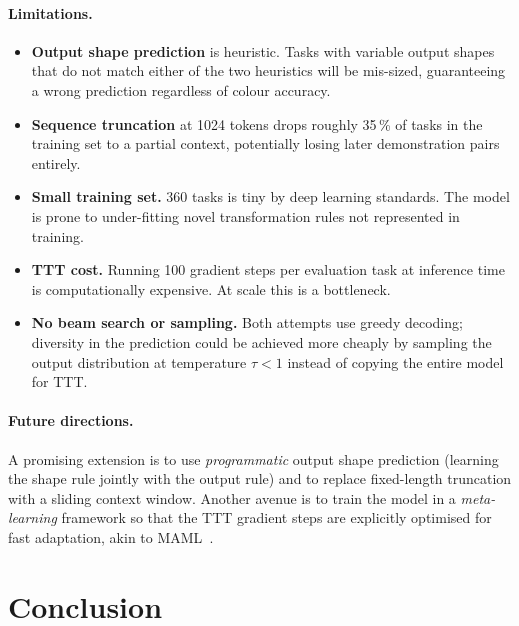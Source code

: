 \documentclass[11pt,a4paper]{article}
\begin{document}
\paragraph{Limitations.}
\begin{itemize}[noitemsep]
  \item \textbf{Output shape prediction} is heuristic.  Tasks with variable output
        shapes that do not match either of the two heuristics will be mis-sized,
        guaranteeing a wrong prediction regardless of colour accuracy.
  \item \textbf{Sequence truncation} at 1024 tokens drops roughly 35\,\% of tasks in
        the training set to a partial context, potentially losing later demonstration
        pairs entirely.
  \item \textbf{Small training set.}  360 tasks is tiny by deep learning standards.
        The model is prone to under-fitting novel transformation rules not represented in
        training.
  \item \textbf{TTT cost.}  Running 100 gradient steps per evaluation task at inference
        time is computationally expensive.  At scale this is a bottleneck.
  \item \textbf{No beam search or sampling.}  Both attempts use greedy decoding;
        diversity in the prediction could be achieved more cheaply by sampling the
        output distribution at temperature $\tau < 1$ instead of copying the entire
        model for TTT.
\end{itemize}

\paragraph{Future directions.}
A promising extension is to use \emph{programmatic} output shape prediction (learning
the shape rule jointly with the output rule) and to replace fixed-length truncation with
a sliding context window.  Another avenue is to train the model in a
\emph{meta-learning} framework so that the TTT gradient steps are explicitly optimised
for fast adaptation, akin to MAML~\cite{finn2017model}.

\section{Conclusion}
\end{document}
